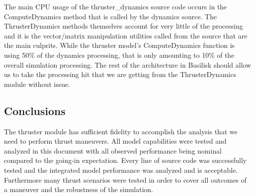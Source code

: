 The main CPU usage of the thruster\_dynamics source code occurs in the 
ComputeDynamics method that is called by the dynamics source.  The 
ThrusterDynamics methods themselves account for very little of the processing 
and it is the vector/matrix manipulation utilities called from the source that 
are the main culprits.  While the thruster model's ComputeDynamics function is 
using 50\% of the dynamics processing, that is only amounting to 10\% of the 
overall simulation processing.  The rest of the architecture in Basilisk should 
allow us to take the processing hit that we are getting from the 
ThrusterDynamics module without issue.

\subsection{Conclusions}
The thruster module has sufficient fidelity to accomplish the analysis 
that we need to perform thrust maneuvers.  All model capabilities were 
tested and analyzed in this document with all observed performance being nominal 
compared to the going-in expectation. Every line of source code was successfully tested and the integrated model 
performance was analyzed and is acceptable. Furthermore many thrust scenarios were tested in order to cover all outcomes of a maneuver and the robustness of the simulation.


